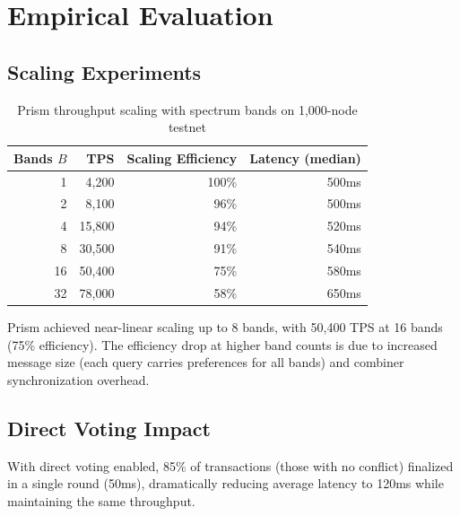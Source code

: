 \section{Empirical Evaluation}

\label{sec:prism-evaluation}

\subsection{Scaling Experiments}

\begin{table}[h]
\centering
\begin{tabular}{@{}rrrr@{}}
\toprule
\textbf{Bands $B$} & \textbf{TPS} & \textbf{Scaling Efficiency} & \textbf{Latency (median)} \\
\midrule
1 & 4,200 & 100\% & 500ms \\
2 & 8,100 & 96\% & 500ms \\
4 & 15,800 & 94\% & 520ms \\
8 & 30,500 & 91\% & 540ms \\
16 & 50,400 & 75\% & 580ms \\
32 & 78,000 & 58\% & 650ms \\
\bottomrule
\end{tabular}
\caption{Prism throughput scaling with spectrum bands on 1,000-node testnet}
\label{tab:prism-scaling}
\end{table}

Prism achieved near-linear scaling up to 8 bands, with 50,400 TPS at 16 bands (75\%
efficiency). The efficiency drop at higher band counts is due to increased message size
(each query carries preferences for all bands) and combiner synchronization overhead.

\subsection{Direct Voting Impact}

With direct voting enabled, 85\% of transactions (those with no conflict) finalized
in a single round (50ms), dramatically reducing average latency to 120ms while
maintaining the same throughput.

